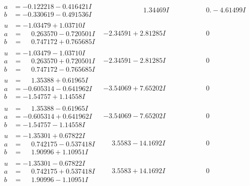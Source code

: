 \documentclass[1p]{elsarticle_modified}
\theoremstyle{definition}
\begin{document}
$$\begin{array}{c|c|c}
\begin{aligned}
a &= -0.122218 - 0.416421 I \\
b &= -0.330619 - 0.491536 I\end{aligned}
 & \phantom{-0.000000 -}1.34469 I & \phantom{-0.000000 } 0. - 4.61499 I \\ \hline\begin{aligned}
u &= -1.03479 + 1.03710 I \\
a &= \phantom{-}0.263570 - 0.720501 I \\
b &= \phantom{-}0.747172 + 0.765685 I\end{aligned}
 & -2.34591 + 2.81285 I & \phantom{-0.000000 } 0 \\ \hline\begin{aligned}
u &= -1.03479 - 1.03710 I \\
a &= \phantom{-}0.263570 + 0.720501 I \\
b &= \phantom{-}0.747172 - 0.765685 I\end{aligned}
 & -2.34591 - 2.81285 I & \phantom{-0.000000 } 0 \\ \hline\begin{aligned}
u &= \phantom{-}1.35388 + 0.61965 I \\
a &= -0.605314 - 0.641962 I \\
b &= -1.54757 + 1.14558 I\end{aligned}
 & -3.54069 + 7.65202 I & \phantom{-0.000000 } 0 \\ \hline\begin{aligned}
u &= \phantom{-}1.35388 - 0.61965 I \\
a &= -0.605314 + 0.641962 I \\
b &= -1.54757 - 1.14558 I\end{aligned}
 & -3.54069 - 7.65202 I & \phantom{-0.000000 } 0 \\ \hline\begin{aligned}
u &= -1.35301 + 0.67822 I \\
a &= \phantom{-}0.742175 - 0.537418 I \\
b &= \phantom{-}1.90996 + 1.10951 I\end{aligned}
 & \phantom{-}3.5583 - 14.1692 I & \phantom{-0.000000 } 0 \\ \hline\begin{aligned}
u &= -1.35301 - 0.67822 I \\
a &= \phantom{-}0.742175 + 0.537418 I \\
b &= \phantom{-}1.90996 - 1.10951 I\end{aligned}
 & \phantom{-}3.5583 + 14.1692 I & \phantom{-0.000000 } 0 \\ \hline\begin{aligned}

\end{aligned}
\end{array}$$
\end{document}
